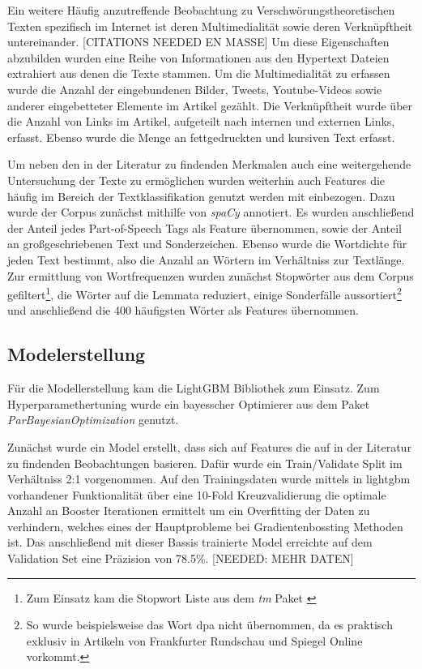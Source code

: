 Ein weitere Häufig anzutreffende Beobachtung zu Verschwörungstheoretischen Texten spezifisch im Internet ist deren Multimedialität sowie deren Verknüpftheit untereinander. [CITATIONS NEEDED EN MASSE]
Um diese Eigenschaften abzubilden wurden eine Reihe von Informationen aus den Hypertext Dateien extrahiert aus denen die Texte stammen.
Um die Multimedialität zu erfassen wurde die Anzahl der eingebundenen Bilder, Tweets, Youtube-Videos sowie anderer eingebetteter Elemente im Artikel gezählt.
Die Verknüpftheit wurde über die Anzahl von Links im Artikel, aufgeteilt nach internen und externen Links, erfasst.
Ebenso wurde die Menge an fettgedruckten und kursiven Text erfasst.

Um neben den in der Literatur zu findenden Merkmalen auch eine weitergehende Untersuchung der Texte zu ermöglichen wurden weiterhin auch Features die häufig im Bereich der Textklassifikation genutzt werden mit einbezogen.
Dazu wurde der Corpus zunächst mithilfe von \textit{spaCy} \parencite[][]{spacy} annotiert.
Es wurden anschließend der Anteil jedes Part-of-Speech Tags als Feature übernommen, sowie der Anteil an großgeschriebenen Text und Sonderzeichen.
Ebenso wurde die Wortdichte für jeden Text bestimmt, also die Anzahl an Wörtern im Verhältniss zur Textlänge.
Zur ermittlung von Wortfrequenzen wurden zunächst Stopwörter aus dem Corpus gefiltert\footnote{Zum Einsatz kam die Stopwort Liste aus dem \textit{tm} Paket \parencite[][]{r-tm}}, die Wörter auf die Lemmata reduziert, einige Sonderfälle aussortiert\footnote{So wurde beispielsweise das Wort dpa nicht übernommen, da es praktisch exklusiv in Artikeln von Frankfurter Rundschau und Spiegel Online vorkommt.} und anschließend die 400 häufigsten Wörter als Features übernommen.

\subsection{Modelerstellung}

Für die Modellerstellung kam die LightGBM \parencite[][]{lightgbm} Bibliothek zum Einsatz. Zum Hyperparamethertuning wurde ein bayesscher Optimierer aus dem Paket \textit{ParBayesianOptimization} \parencite{bayes} genutzt.

Zunächst wurde ein Model erstellt, dass sich auf Features die auf in der Literatur zu findenden Beobachtungen basieren.
Dafür wurde ein Train/Validate Split im Verhältniss 2:1 vorgenommen.
Auf den Trainingsdaten wurde mittels in lightgbm vorhandener Funktionalität über eine 10-Fold Kreuzvalidierung die optimale Anzahl an Booster Iterationen ermittelt um ein Overfitting der Daten zu verhindern, welches eines der Hauptprobleme bei Gradientenbossting Methoden ist.
Das anschließend mit dieser Bassis trainierte Model erreichte auf dem Validation Set eine Präzision von 78.5\%. [NEEDED: MEHR DATEN]

